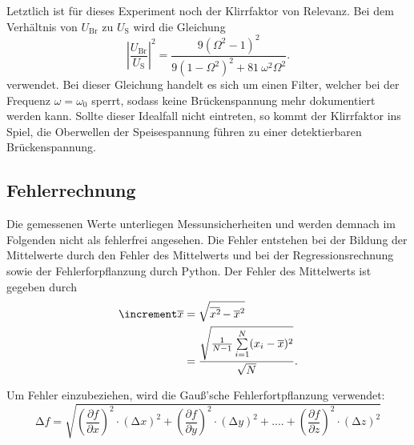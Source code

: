 Letztlich ist für dieses Experiment noch der Klirrfaktor von Relevanz. Bei dem 
Verhältnis von $U_{\text{Br}}$ zu $U_{\text{S}}$ wird die Gleichung
\begin{equation}
    \label{eqn:omega}
    \left|\frac{U_{\text{Br}}}{U_{\text{S}}}\right|^2 = \frac{9(\Omega ^2 -1)^2}{9(1-\Omega^2)^2+81 \: \omega ^2 \Omega^2}.
\end{equation}
verwendet. Bei dieser Gleichung handelt es sich um einen Filter, welcher bei der Frequenz 
$\omega=\omega_0$ sperrt, sodass keine Brückenspannung mehr dokumentiert werden 
kann. Sollte dieser Idealfall nicht eintreten, so kommt der Klirrfaktor ins Spiel, 
die Oberwellen der Speisespannung führen zu einer detektierbaren Brückenspannung.

\subsection{Fehlerrechnung}
Die gemessenen Werte unterliegen Messunsicherheiten und werden demnach im
Folgenden nicht als fehlerfrei angesehen. Die Fehler entstehen bei der
Bildung der Mittelwerte durch den Fehler des Mittelwerts und bei der
Regressionsrechnung sowie der Fehlerforpflanzung durch Python.
Der Fehler des Mittelwerts ist gegeben durch 
\begin{equation}
    \begin{aligned}
        \increment \overline{x} &= \sqrt{\overline{x^2\kern-0.1em} - \overline{x}^2} \\
                            &= \frac{\sqrt{\frac{1}{N-1} \sum\limits_{i=1}^N (x_i - \overline{x})^2}}{\sqrt{N}}.
    \end{aligned}
\end{equation}

Um Fehler einzubeziehen, wird die Gauß'sche Fehlerfortpflanzung verwendet:
\begin{equation}
    \label{eqn:8}
    \increment f = \sqrt{\left(\frac{\partial f}{\partial x}\right)^2 \cdot \left(\increment x\right)^2 + \left(\frac{\partial f}{\partial y}\right)^2 \cdot \left(\increment y\right)^2 + .... + \left(\frac{\partial f}{\partial z}\right)^2 \cdot \left(\increment z\right)^2}
\end{equation}